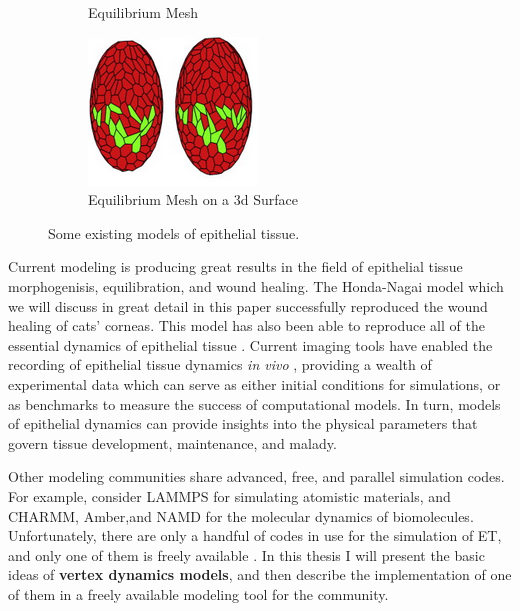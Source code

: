 \begin{figure}[h]
\begin{subfigure}[b]{0.4\textwidth}
        \caption{Equilibrium Mesh\cite{HondaNagai}}
        \label{fig:Honda}
    \end{subfigure}
    \hfill
    \begin{subfigure}[b]{0.4\textwidth}
        \centering
        \includegraphics[width=\textwidth]{../diagrams/mirim.png}
        \caption{Equilibrium Mesh on a 3d Surface \cite{VertexModels}}
        \label{fig:mirim}
    \end{subfigure}
    \caption{Some existing models of epithelial tissue.}
    \label{fig:four graphs}
\end{figure}


Current modeling is producing great results in the field of epithelial tissue morphogenisis, equilibration, and wound healing. The Honda-Nagai model which we will discuss in great detail in this paper successfully reproduced the wound healing of cats' corneas\cite{WoundHealing}. This model has also been able to reproduce all of the essential dynamics of epithelial tissue \cite{HondaNagai}.  Current imaging tools have enabled the recording of epithelial tissue dynamics \emph{in vivo} \cite{Solokow}\cite{Xiong}, providing a wealth of experimental data which can serve as either initial conditions for simulations, or as benchmarks to measure the success of computational models. In turn, models of epithelial dynamics can provide insights into the physical parameters that govern tissue development, maintenance, and malady.

Other modeling communities share advanced, free, and parallel simulation codes. For example, consider LAMMPS for simulating atomistic materials, and CHARMM, Amber,and NAMD for the molecular dynamics of biomolecules. Unfortunately, there are only a handful of codes in use for the simulation of ET, and only one of them is freely available \cite{ChasteMain}. In this thesis I will present the basic ideas of \textbf{vertex dynamics models}, and then describe the implementation of one of them in a freely available modeling tool for the community.

